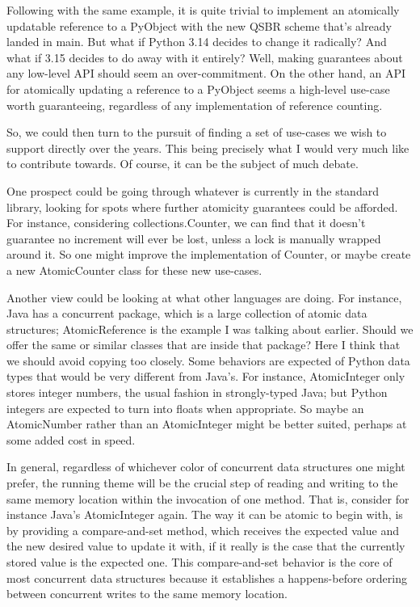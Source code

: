 Following with the same example, it is quite trivial to implement an atomically updatable reference to a PyObject with the new QSBR scheme that's already landed in main.
But what if Python 3.14 decides to change it radically?
And what if 3.15 decides to do away with it entirely?
Well, making guarantees about any low-level API should seem an over-commitment.
On the other hand, an API for atomically updating a reference to a PyObject seems a high-level use-case worth guaranteeing, regardless of any implementation of reference counting.

So, we could then turn to the pursuit of finding a set of use-cases we wish to support directly over the years.
This being precisely what I would very much like to contribute towards.
Of course, it can be the subject of much debate.

One prospect could be going through whatever is currently in the standard library, looking for spots where further atomicity guarantees could be afforded.
 For instance, considering collections.Counter, we can find that it doesn't guarantee no increment will ever be lost, unless a lock is manually wrapped around it.
So one might improve the implementation of Counter, or maybe create a new AtomicCounter class for these new use-cases.

Another view could be looking at what other languages are doing.
For instance,  Java has a concurrent package, which is a large collection of atomic data structures; AtomicReference is the example I was talking about earlier.
Should we offer the same or similar classes that are inside that package?
Here I think that we should avoid copying too closely.
Some behaviors are expected of Python data types that would be very different from Java's.
For instance, AtomicInteger only stores integer numbers, the usual fashion in strongly-typed Java; but Python integers are expected to turn into floats when appropriate.
So maybe an AtomicNumber rather than an AtomicInteger might be better suited, perhaps at some added cost in speed.

In general, regardless of whichever color of concurrent data structures one might prefer, the running theme will be the crucial step of reading and writing to the same memory location within the invocation of one method.
That is, consider for instance Java's AtomicInteger again.
The way it can be atomic to begin with, is by providing a compare-and-set method, which receives the expected value and the new desired value to update it with, if it really is the case that the currently stored value is the expected one.
This compare-and-set behavior is the core of most concurrent data structures because it establishes a happens-before ordering between concurrent writes to the same memory location.

